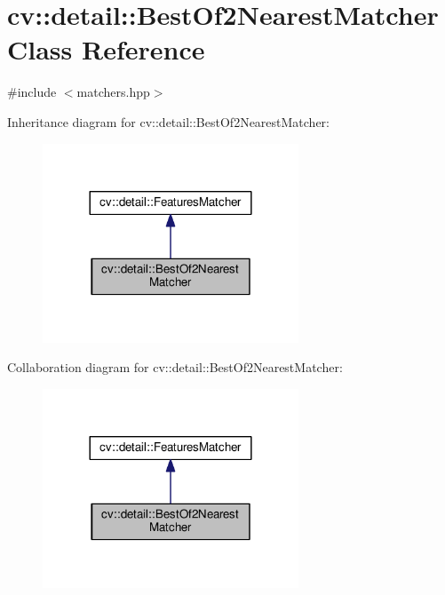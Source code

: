 \hypertarget{classcv_1_1detail_1_1BestOf2NearestMatcher}{\section{cv\-:\-:detail\-:\-:Best\-Of2\-Nearest\-Matcher Class Reference}
\label{classcv_1_1detail_1_1BestOf2NearestMatcher}
}


{\ttfamily \#include $<$matchers.\-hpp$>$}



Inheritance diagram for cv\-:\-:detail\-:\-:Best\-Of2\-Nearest\-Matcher\-:\nopagebreak
\begin{figure}[H]
\begin{center}
\leavevmode
\includegraphics[width=216pt]{classcv_1_1detail_1_1BestOf2NearestMatcher__inherit__graph}
\end{center}
\end{figure}


Collaboration diagram for cv\-:\-:detail\-:\-:Best\-Of2\-Nearest\-Matcher\-:\nopagebreak
\begin{figure}[H]
\begin{center}
\leavevmode
\includegraphics[width=216pt]{classcv_1_1detail_1_1BestOf2NearestMatcher__coll__graph}
\end{center}
\end{figure}

